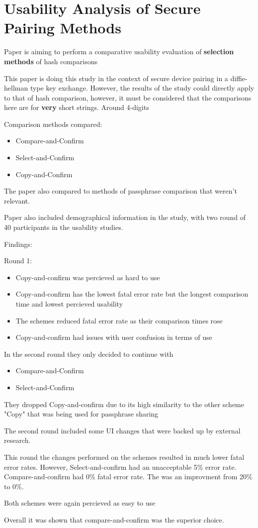 \section{Usability Analysis of Secure Pairing Methods}

Paper is aiming to perform a comparative usability evaluation of \textbf{selection methods} of hash comparisons

This paper is doing this study in the context of secure device pairing in a diffie-hellman type key exchange. However, the results of the study could directly apply to that of hash comparison, however, it must be considered that the comparisons here are for \textbf{very} short strings. Around 4-digits 

Comparison methods compared:
\begin{itemize}
    \item Compare-and-Confirm
    \item Select-and-Confirm
    \item Copy-and-Confirm
\end{itemize}

The paper also compared to methods of passphrase comparison that weren't relevant.

Paper also included demographical information in the study, with two round of 40 participants in the usability studies.


Findings:

Round 1:
\begin{itemize}
    \item Copy-and-confirm was percieved as hard to use
    \item Copy-and-confirm has the lowest fatal error rate but the longest comparison time and lowest percieved usability
    \item The schemes reduced fatal error rate as their comparison times rose
    \item Copy-and-confirm had issues with user confusion in terms of use
\end{itemize}

In the second round they only decided to continue with

\begin{itemize}
    \item Compare-and-Confirm
    \item Select-and-Confirm
\end{itemize}

They dropped Copy-and-confirm due to its high similarity to the other scheme "Copy" that was being used for passphrase sharing

The second round included some UI changes that were backed up by external research.

This round the changes performed on the schemes resulted in much lower fatal error rates. However, Select-and-confirm had an unacceptable 5\% error rate. Compare-and-confirm had 0\% fatal error rate. The was an improvment from 20\% to 0\%.

Both schemes were again percieved as easy to use

Overall it was shown that compare-and-confirm was the superior choice.